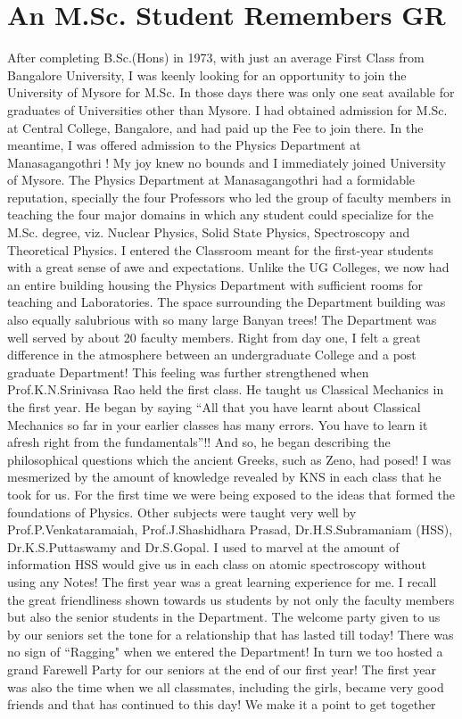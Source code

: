 \chapter{An M.Sc. Student Remembers GR}\label{chap8}




After completing B.Sc.(Hons) in 1973, with just an average First Class from Bangalore University, I was keenly looking for an opportunity to join the University of Mysore for M.Sc. In those days there was only one seat available for graduates of Universities other than Mysore. I had obtained admission for M.Sc. at Central College, Bangalore, and had paid up the Fee to join there. In the meantime, I was offered admission to the Physics Department at Manasagangothri ! My joy knew no bounds and I immediately joined University of Mysore. The Physics Department at Manasagangothri had a formidable reputation, specially the four Professors who led the group of faculty members in teaching the four major domains in which any student could specialize for the M.Sc. degree, viz. Nuclear Physics, Solid State Physics, Spectroscopy and Theoretical Physics. I entered the Classroom meant for the first-year students with a great sense of awe and expectations. Unlike the UG Colleges, we now had an entire building housing the Physics Department with sufficient rooms for teaching and Laboratories. The space surrounding the Department building was also equally salubrious with so many large Banyan trees! The Department was well served by about 20 faculty members. Right from day one, I felt a great difference in the atmosphere between an undergraduate College and a post graduate Department! This feeling was further strengthened when Prof.K.N.Srinivasa Rao held the first class. He taught us Classical Mechanics in the first year. He began by saying  ``All that you have learnt about Classical Mechanics so far in your earlier classes has many errors. You have to learn it afresh right from the fundamentals”!! And so, he began describing the philosophical questions which the ancient Greeks, such as Zeno, had posed! I was mesmerized by the amount of knowledge revealed by KNS in each class that he took for us. For the first time we were being exposed to the ideas that formed the foundations of Physics. Other subjects were taught very well by Prof.P.Venkataramaiah, Prof.J.Shashidhara Prasad, Dr.H.S.Subramaniam (HSS), Dr.K.S.Puttaswamy and Dr.S.Gopal. I used to marvel at the amount of information HSS would give us in each class on atomic spectroscopy without using any Notes! The first year was a great learning experience for me. I recall the great friendliness shown towards us students by not only the faculty members but also the senior students in the Department. The welcome party given to us by our seniors set the tone for a relationship that has lasted till today! There was no sign of ``Ragging" when we entered the Department! In turn we too hosted a grand Farewell Party for our seniors at the end of our first year! The first year was also the time when we all classmates, including the girls, became very good friends and that has continued to this day! We make it a point to get together 